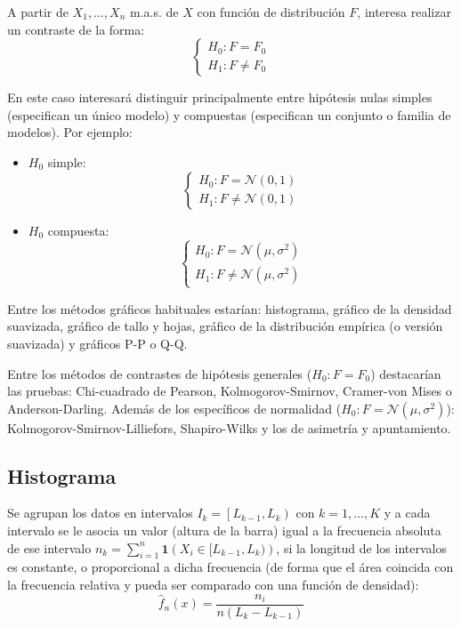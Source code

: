 \documentclass[
  10pt,
]{book}
\renewcommand{\mathbf}[1]{\symbf{#1}}
\theoremstyle{break}
\theoremstyle{nonumberplain}
\begin{document}
A partir de \(X_1,\ldots,X_n\) m.a.s. de \(X\) con función de
distribución \(F\), interesa realizar un contraste de la forma:
\[\left \{
\begin{array}{l}
H_0:F=F_0\\
H_1:F\neq F_0
\end{array}
\right.\]

En este caso interesará distinguir principalmente entre hipótesis nulas simples (especifican un único modelo) y compuestas (especifican un conjunto o familia de modelos).
Por ejemplo:

\begin{itemize}
\item
  \(H_0\) simple:
  \[\left \{
  \begin{array}{l}  
  H_0:F= \mathcal{N}(0,1)\\
  H_1:F\neq \mathcal{N}(0,1)
  \end{array}
  \right.\]
\item
  \(H_0\) compuesta:
  \[\left \{
  \begin{array}{l}  
  H_0:F= \mathcal{N}(\mu,\sigma^2)\\
  H_1:F\neq \mathcal{N}(\mu,\sigma^2)
  \end{array}
  \right.\]
\end{itemize}

Entre los métodos gráficos habituales estarían: histograma, gráfico de la densidad suavizada, gráfico de tallo y hojas, gráfico de la distribución empírica (o versión suavizada) y gráficos P-P o Q-Q.

Entre los métodos de contrastes de hipótesis generales (\(H_0:F=F_0\)) destacarían las pruebas: Chi-cuadrado de Pearson, Kolmogorov-Smirnov, Cramer-von Mises o Anderson-Darling.
Además de los específicos de normalidad (\(H_0:F= \mathcal{N}(\mu,\sigma^2)\)): Kolmogorov-Smirnov-Lilliefors, Shapiro-Wilks y los de asimetría y apuntamiento.

\hypertarget{histograma}{%
\subsection{Histograma}\label{histograma}}

Se agrupan los datos en intervalos \(I_{k}=\left[ L_{k-1},L_{k}\right)\) con \(k=1, \ldots, K\) y a cada intervalo se le asocia un valor (altura de la barra) igual a la frecuencia absoluta de ese intervalo \(n_k = \sum_{i=1}^{n}\mathbf{1}\left( X_i \in [L_{k-1},L_{k}) \right)\), si la longitud de los intervalos es constante, o proporcional a dicha frecuencia (de forma que el área coincida con la frecuencia relativa y pueda ser comparado con una función de densidad):
\[\hat{f}_n(x)=\frac{n_{i}}{n\left(  L_{k}-L_{k-1}\right)}\]
\end{document}

